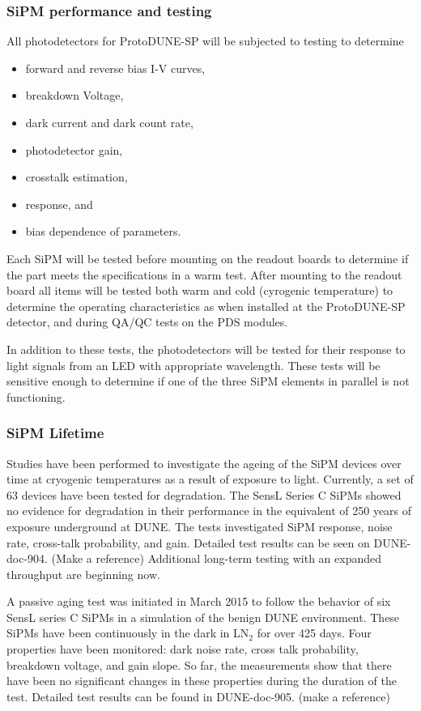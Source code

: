 \subsubsection{SiPM performance and testing}

All photodetectors for ProtoDUNE-SP will be subjected to testing to determine
\begin{itemize}
\item forward and reverse bias I-V curves,
\item breakdown Voltage,
\item dark current and dark count rate,
\item photodetector gain,
\item crosstalk estimation,
\item response, and
\item bias dependence of parameters.
\end{itemize}
Each SiPM will be tested before mounting on the readout boards to determine
if the part meets the specifications in a warm test.  After mounting to
the readout board all items will be tested both warm and cold (cyrogenic 
temperature) to determine the operating characteristics as when %
installed at the ProtoDUNE-SP detector, and during QA/QC tests on the PDS modules.

In addition to these tests, the photodetectors will be tested for their
response to light signals from an LED with appropriate wavelength.
These tests will be sensitive enough to determine if one of the three SiPM
elements in parallel is not functioning.


\subsubsection{SiPM Lifetime}
Studies have been performed to investigate the ageing of the SiPM devices over time at 
cryogenic temperatures as a result of exposure to light.
Currently, a set of 63 devices have been tested for degradation.
The SensL Series C SiPMs showed no evidence for degradation in their 
performance in the equivalent of 250 years of exposure underground at DUNE. 
The tests investigated SiPM response, noise rate, cross-talk probability, and
gain.
Detailed test results can be seen on DUNE-doc-904. (Make a reference) 
Additional long-term testing with an expanded throughput are beginning
now.

A passive aging test was initiated in March 2015 to follow the
behavior of six SensL series C SiPMs in a simulation of the benign
DUNE environment. These SiPMs have been continuously in the
dark in LN$_2$ for over 425 days. Four properties have been monitored:
dark noise rate, cross talk probability, breakdown voltage, and gain
slope. So far, the measurements show that there
have been no significant changes in these properties during the
duration of the test.
Detailed test results can be found in DUNE-doc-905. (make a reference)

